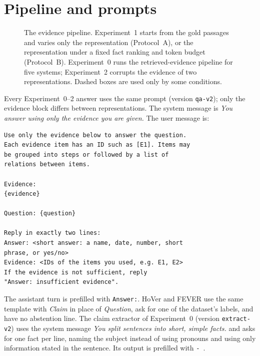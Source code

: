 \appendix

\section{Pipeline and prompts}
\label{app:prompts}

\begin{figure}[t]
\centering
\resizebox{\textwidth}{!}{}
\caption{The evidence pipeline. Experiment~1 starts from the gold passages and varies only the representation (Protocol~A), or the representation under a fixed fact ranking and token budget (Protocol~B). Experiment~0 runs the retrieved-evidence pipeline for five systems; Experiment~2 corrupts the evidence of two representations. Dashed boxes are used only by some conditions.}
\label{fig:pipeline}
\end{figure}


Every Experiment~0--2 answer uses the same prompt (version \texttt{qa-v2}); only the evidence block differs between representations. The system message is \emph{You answer using only the evidence you are given.} The user message is:

\begin{footnotesize}
\begin{verbatim}
Use only the evidence below to answer the question.
Each evidence item has an ID such as [E1]. Items may
be grouped into steps or followed by a list of
relations between items.

Evidence:
{evidence}

Question: {question}

Reply in exactly two lines:
Answer: <short answer: a name, date, number, short
phrase, or yes/no>
Evidence: <IDs of the items you used, e.g. E1, E2>
If the evidence is not sufficient, reply
"Answer: insufficient evidence".
\end{verbatim}
\end{footnotesize}

\noindent The assistant turn is prefilled with \texttt{Answer:}. HoVer and FEVER use the same template with \emph{Claim} in place of \emph{Question}, ask for one of the dataset's labels, and have no abstention line. The claim extractor of Experiment~0 (version \texttt{extract-v2}) uses the system message \emph{You split sentences into short, simple facts.} and asks for one fact per line, naming the subject instead of using pronouns and using only information stated in the sentence. Its output is prefilled with \texttt{- }.

